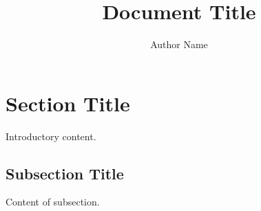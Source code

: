 \documentclass[12pt, a4paper]{article}
\title{Document Title}
\author{Author Name}
\affil{Author Affiliation}
\date{} %
\begin{document}
\maketitle
\section{Section Title}
Introductory content.
\subsection{Subsection Title}
Content of subsection.
\end{document}

